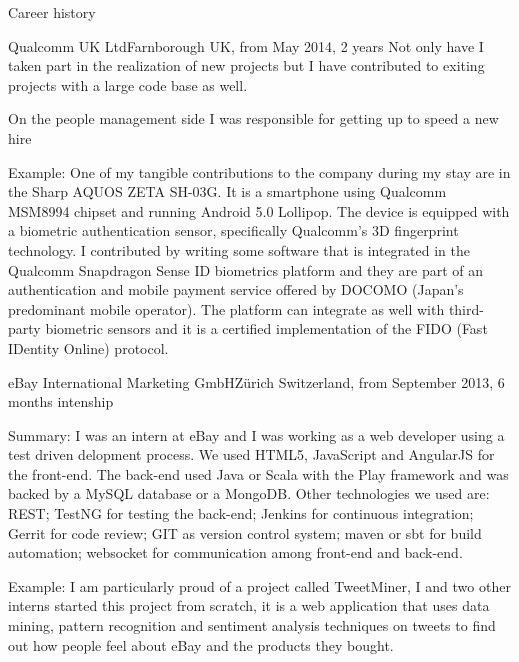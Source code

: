\documentclass{resume}
\begin{document}
\begin{rSection}{Career history}
\begin{rSubsection}{Qualcomm UK Ltd}{Farnborough UK, from May 2014, 2 years}{}{}
	  Not only have I taken part in the realization of new projects but I have contributed to exiting projects with a large code base as well.

	  On the people management side I was responsible for getting up to speed a new hire
	  
	  
	\item[Example:]
	  One of my tangible contributions to the company during my stay are in the Sharp AQUOS ZETA SH-03G.
	  It is a smartphone using Qualcomm MSM8994 chipset and running Android 5.0 Lollipop. 
	  The device is equipped with a biometric authentication sensor, specifically
	  Qualcomm's 3D fingerprint technology.
	  I contributed by writing some software
	  that is integrated in the Qualcomm Snapdragon Sense ID biometrics platform and they
	  are part of an authentication and mobile payment service offered by DOCOMO (Japan's predominant mobile operator).
	  The platform can integrate as well with third-party biometric sensors and it is a certified
	  implementation of the FIDO (Fast IDentity Online) protocol.
    \end{rSubsection}

    \begin{rSubsection}{eBay International Marketing GmbH}{Z\"urich Switzerland, from September 2013, 6 months intenship}{}{}
	  \item[Summary:]  
	    I was an intern at eBay and I was working as a web developer using a test driven delopment process. 
	    We used HTML5, JavaScript and AngularJS for the front-end. 
	    The back-end used Java or Scala with the Play framework and was backed by a MySQL database or a MongoDB. 
	    Other technologies we used are: 
	        REST;
	    	TestNG for testing the back-end; 
		Jenkins for continuous integration; 
		Gerrit for code review; 
	    	GIT as version control system; 
		maven or sbt for build automation;
		websocket for communication among front-end and back-end.	  
	  \item[Example:]
	    I am particularly proud of a project called TweetMiner, 
	    I and two other interns started this project from scratch,
	    it is a web application that uses data mining, pattern recognition and sentiment analysis techniques on tweets to find out how people feel about eBay and the products they bought. 
    \end{rSubsection}


\end{rSection}
\end{document}
